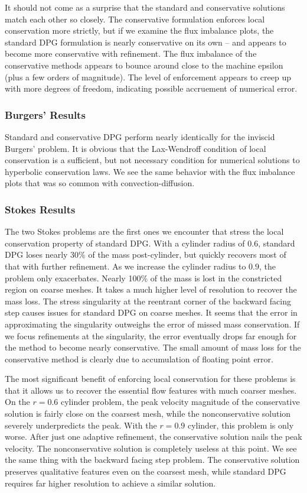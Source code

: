 \documentclass[letterpaper]{article}
\begin{document}
It should not come as a surprise that the standard and conservative
solutions match each other so closely. The conservative formulation
enforces local conservation more strictly, but if we examine the flux
imbalance plots, the standard DPG formulation is nearly conservative on its
own -- and appears to become more conservative with refinement. The flux
imbalance of the conservative methods appears to bounce around close to the
machine epsilon (plus a few orders of magnitude). The level of enforcement
appears to creep up with more degrees of freedom, indicating possible
accruement of numerical error.

\subsubsection{Burgers' Results}
Standard and conservative DPG perform nearly identically for the
inviscid Burgers' problem. It is obvious that the Lax-Wendroff condition of
local conservation is a sufficient, but not necessary condition for numerical
solutions to hyperbolic conservation laws. We see the same behavior with the
flux imbalance plots that was so common with convection-diffusion.

\subsubsection{Stokes Results}
The two Stokes problems are the first ones we encounter that stress the local
conservation property of standard DPG. With a cylinder radius of $0.6$,
standard DPG loses nearly 30\% of the mass post-cylinder, but quickly recovers
most of that with further refinement. As we increase the cylinder radius to
$0.9$, the problem only exacerbates. Nearly 100\% of the mass is lost in the
constricted region on coarse meshes. It takes a much higher level of
resolution to recover the mass loss. The stress singularity at the reentrant
corner of the backward facing step causes issues for standard DPG on coarse
meshes. It seems that the error in approximating the singularity outweighs the
error of missed mass conservation. If we focus refinements at the singularity,
the error eventually drops far enough for the method to become nearly
conservative.
The small amount of mass loss for the conservative method is clearly due to
accumulation of floating point error.

The most significant benefit of enforcing local conservation for these
problems is that it allows us to recover the essential flow features with much
coarser meshes. On the $r=0.6$ cylinder problem, the peak velocity magnitude
of the conservative solution is fairly close on the coarsest mesh, while the
nonconservative solution severely underpredicts the peak. With the $r=0.9$
cylinder, this problem is only worse. After just one adaptive
refinement, the conservative solution nails the peak velocity. The
nonconservative solution is completely useless at this point. We see the same
thing with the backward facing step problem. The conservative solution preserves
qualitative features even on the coarsest mesh, while standard DPG requires far higher resolution
to achieve a similar solution. 
\end{document}
